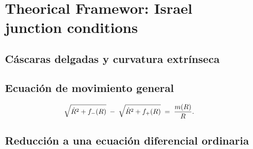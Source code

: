 \chapter{Theorical Framewor: Israel junction conditions}\label{cap:marco}

\section{Cáscaras delgadas y curvatura extrínseca}

\section{Ecuación de movimiento general}
\label{sec:eom-general}
\begin{equation}
    \sqrt{\dot{R}^2 + f_-(R)} \;-\; \sqrt{\dot{R}^2 + f_+(R)} \;=\; \frac{m(R)}{R}.
    \label{eq:maestra}
\end{equation}

\section{Reducción a una ecuación diferencial ordinaria}
